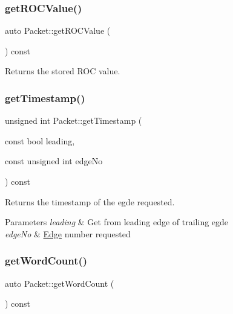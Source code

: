 \subsubsection{\texorpdfstring{get\+R\+O\+C\+Value()}{getROCValue()}}
{\footnotesize\ttfamily auto Packet\+::get\+R\+O\+C\+Value (\begin{DoxyParamCaption}{ }\end{DoxyParamCaption}) const\hspace{0.3cm}{\ttfamily [inline]}}



Returns the stored R\+OC value. 

\mbox{\label{class_packet_a7a15b0965a125dd8441297007581c637}} 
\subsubsection{\texorpdfstring{get\+Timestamp()}{getTimestamp()}}
{\footnotesize\ttfamily unsigned int Packet\+::get\+Timestamp (\begin{DoxyParamCaption}\item[{const bool}]{leading,  }\item[{const unsigned int}]{edge\+No }\end{DoxyParamCaption}) const}



Returns the timestamp of the egde requested. 


\begin{DoxyParams}{Parameters}
{\em leading} & Get from leading edge of trailing egde \\
\hline
{\em edge\+No} & \hyperlink{class_edge}{Edge} number requested \\
\hline
\end{DoxyParams}
\mbox{\label{class_packet_acc5b482de1ed4ee94804993dc67160b0}} 
\subsubsection{\texorpdfstring{get\+Word\+Count()}{getWordCount()}}
{\footnotesize\ttfamily auto Packet\+::get\+Word\+Count (\begin{DoxyParamCaption}{ }\end{DoxyParamCaption}) const\hspace{0.3cm}{\ttfamily [inline]}}



